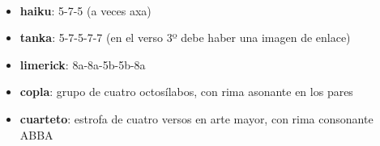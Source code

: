 \\[0.1cm]


\begin{itemize}
	\item {\bf haiku}: 5-7-5 (a veces axa)
	\item {\bf tanka}: 5-7-5-7-7 (en el verso 3º debe haber una imagen de enlace)
	\item {\bf limerick}: 8a-8a-5b-5b-8a 
	\item {\bf copla}: grupo de cuatro octosílabos, con rima asonante en los pares
	\item {\bf cuarteto}: estrofa de cuatro versos en arte mayor, con rima consonante ABBA
\end{itemize}

